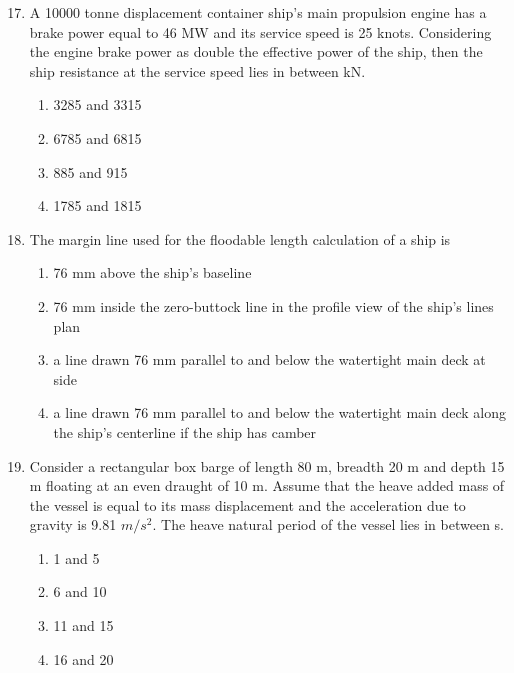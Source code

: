 \documentclass[journal]{IEEEtran}
\theoremstyle{remark}
\begin{document}
\begin{enumerate}[itemsep=1em]
\setcounter{enumi}{16}
\item A 10000 tonne displacement container ship's main propulsion engine has a brake power equal to 46 MW and its service speed is 25 knots. Considering the engine brake power as double the effective power of the ship, then the ship resistance at the service speed lies in between \underline{\hspace{2cm}} kN. 
\begin{multicols}{4}
\begin{enumerate}
    \item 3285 and 3315 
    \item 6785 and 6815 
    \item 885 and 915 
    \item 1785 and 1815 
\end{enumerate}   
\end{multicols}
\end{enumerate}

\begin{enumerate}[itemsep=1em]
\setcounter{enumi}{17}
\item The margin line used for the floodable length calculation of a ship is
\begin{enumerate}[leftmargin=2.5em, labelsep=0.5em, itemsep=0.5em]
    \item 76 mm above the ship's baseline 
    \item 76 mm inside the zero-buttock line in the profile view of the ship's lines plan 
    \item a line drawn 76 mm parallel to and below the watertight main deck at side 
    \item a line drawn 76 mm parallel to and below the watertight main deck along the ship's centerline if the ship has camber 
\end{enumerate}
\end{enumerate}

\begin{enumerate}[itemsep=1em]
\setcounter{enumi}{18}
\item Consider a rectangular box barge of length 80 m, breadth 20 m and depth 15 m floating at an even draught of 10 m. Assume that the heave added mass of the vessel is equal to its mass displacement and the acceleration due to gravity is 9.81 $m/s^2$. The heave natural period of the vessel lies in between \underline{\hspace{2cm}} s.
\begin{multicols}{4}
\begin{enumerate}
    \item 1 and 5
    \item 6 and 10 
    \item 11 and 15 
    \item 16 and 20 
\end{enumerate}  
\end{multicols}
\end{enumerate}
\end{document}
